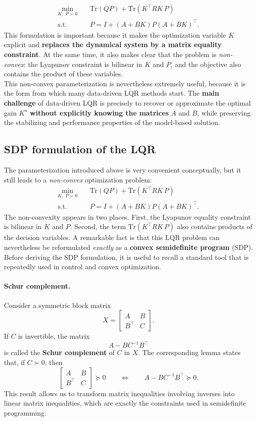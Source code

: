 \[
\begin{aligned}
\min_{K,\;P \succ 0}\quad
& \mathrm{Tr}(QP) + \mathrm{Tr}(K^\top R K\,P) \\
\text{s.t.}\quad
& P = I + (A+BK)P(A+BK)^\top .
\end{aligned}
\]
This formulation is important because it makes the optimization variable $K$ explicit and
\textbf{replaces the dynamical system by a matrix equality constraint}. At the same time, it also makes clear that the problem is \emph{non-convex}: the Lyapunov constraint is bilinear in $K$ and $P$, and the objective also contains the product of these variables.\\
This non-convex parameterization is nevertheless extremely useful, because it is the form from
which many data-driven LQR methods start. The \textbf{main challenge} of data-driven LQR is precisely to recover or approximate the optimal gain $K^\star$ \textbf{without explicitly knowing the matrices} $A$ and $B$, while preserving the stabilizing and performance properties of the model-based solution.

\subsection{SDP formulation of the LQR}

The parameterization introduced above is very convenient conceptually, but it still leads to a
\emph{non-convex} optimization problem:
\[
\begin{aligned}
\min_{K,\;P \succ 0}\quad
& \text{Tr}(QP) + \text{Tr}(K^\top R K\,P) \\
\text{s.t.}\quad
& P = I + (A+BK)P(A+BK)^\top .
\end{aligned}
\]
The non-convexity appears in two places. First, the Lyapunov equality constraint is bilinear in
$K$ and $P$. Second, the term $\text{Tr}(K^\top R K\,P)$ also contains products of the decision
variables. A remarkable fact is that this LQR problem can nevertheless be reformulated
\emph{exactly} as a \textbf{convex semidefinite program} (SDP).\\
Before deriving the SDP formulation, it is useful to recall a standard tool that is repeatedly used
in control and convex optimization.

\paragraph{Schur complement.}
Consider a symmetric block matrix
\[
X=\begin{bmatrix}
A & B\\
B^\top & C
\end{bmatrix}.
\]
If $C$ is invertible, the matrix
\[
A-BC^{-1}B^\top
\]
is called the \textbf{Schur complement} of $C$ in $X$.
The corresponding lemma states that, if $C\succ 0$, then
\[
\begin{bmatrix}
A & B\\
B^\top & C
\end{bmatrix}\succeq 0
\qquad \Longleftrightarrow \qquad
A-BC^{-1}B^\top \succeq 0.
\]
This result allows us to transform matrix inequalities involving inverses into linear matrix
inequalities, which are exactly the constraints used in semidefinite programming.

